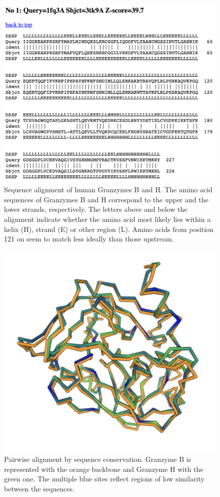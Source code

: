 \documentclass[
]{article}
\begin{document}
\begin{figure}

{\centering \includegraphics[width=0.6\linewidth]{secondary structure alignment/sequence_alignment} 

}

\caption{Sequence alignment of human Granzymes B and H. The amino acid sequences of Granzymes B and H correspond to the upper and the lower strands, respectively. The letters above and below the alignment indicate whether the amino acid most likely lies within a helix (H), strand (E) or other region (L). Amino acids from position 121 on seem to match less ideally than those upstream.}\label{fig:Fig3a}
\end{figure}

\begin{figure}

{\centering \includegraphics[width=0.6\linewidth]{secondary structure alignment/sequence_conservation} 

}

\caption{Pairwise alignment by sequence conservation. Granzyme B is represented with the orange backbone and Granzyme H with the green one. The multiple blue sites reflect regions of low similarity between the sequences.}\label{fig:Fig3b}
\end{figure}
\end{document}
